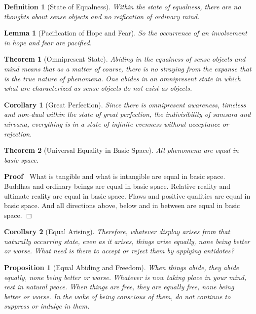\documentclass{article}
\newenvironment{proof}{\noindent\textbf{Proof\ }}{\hspace*{\fill}$\Box$\medskip}
\newtheorem{corollary}{Corollary}
\newtheorem{definition}{Definition}
\newtheorem{lemma}{Lemma}
\newtheorem{proposition}{Proposition}
{\theorembodyfont{\rmfamily}\newtheorem{remark}{Remark}}
\newtheorem{theorem}{Theorem}
\begin{document}
\begin{definition}
  [State of Equalness] Within the state of equalness, there are no thoughts
  about sense objects and no reification of ordinary mind.
\end{definition}

\begin{lemma}
  [Pacification of Hope and Fear] So the occurrence of an involvement in hope
  and fear are pacified.
\end{lemma}

\begin{theorem}
  [Omnipresent State] Abiding in the equalness of sense objects and mind means
  that as a matter of course, there is no straying from the expanse that is
  the true nature of phenomena. One abides in an omnipresent state in which
  what are characterized as sense objects do not exist as objects.
\end{theorem}

\begin{corollary}
  [Great Perfection] Since there is omnipresent awareness, timeless and
  non-dual within the state of great perfection, the indivisibility of samsara
  and nirvana, everything is in a state of infinite evenness without
  acceptance or rejection.
\end{corollary}

\begin{theorem}
  [Universal Equality in Basic Space] All phenomena are equal in basic space.
\end{theorem}

\begin{proof}
  What is tangible and what is intangible are equal in basic space. Buddhas
  and ordinary beings are equal in basic space. Relative reality and ultimate
  reality are equal in basic space. Flaws and positive qualities are equal in
  basic space. And all directions above, below and in between are equal in
  basic space.
\end{proof}

\begin{corollary}
  [Equal Arising] Therefore, whatever display arises from that naturally
  occurring state, even as it arises, things arise equally, none being better
  or worse. What need is there to accept or reject them by applying antidotes?
\end{corollary}

\begin{proposition}
  [Equal Abiding and Freedom] When things abide, they abide equally, none
  being better or worse. Whatever is now taking place in your mind, rest in
  natural peace. When things are free, they are equally free, none being
  better or worse. In the wake of being conscious of them, do not continue to
  suppress or indulge in them.
\end{proposition}
\end{document}
